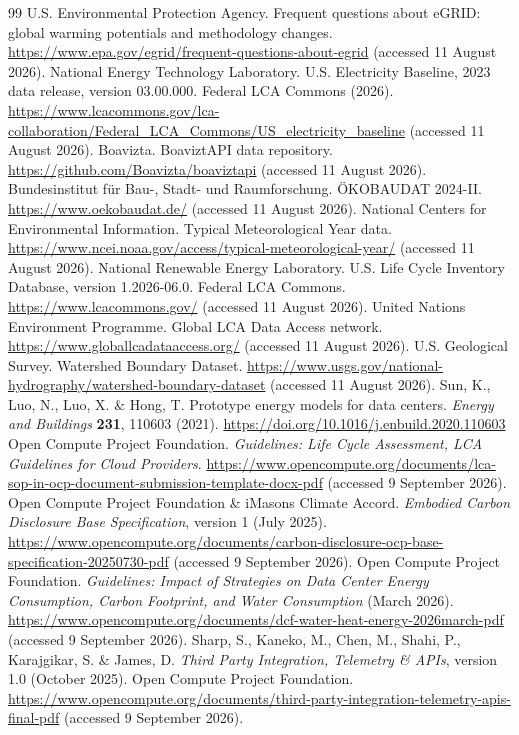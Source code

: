 \documentclass[review,12pt]{elsarticle}
\begin{document}
\begin{thebibliography}{99}
 U.S. Environmental Protection Agency. Frequent questions about eGRID: global warming potentials and methodology changes. \url{https://www.epa.gov/egrid/frequent-questions-about-egrid} (accessed 11 August 2026).
 National Energy Technology Laboratory. U.S. Electricity Baseline, 2023 data release, version 03.00.000. Federal LCA Commons (2026). \url{https://www.lcacommons.gov/lca-collaboration/Federal_LCA_Commons/US_electricity_baseline} (accessed 11 August 2026).
 Boavizta. BoaviztAPI data repository. \url{https://github.com/Boavizta/boaviztapi} (accessed 11 August 2026).
 Bundesinstitut für Bau-, Stadt- und Raumforschung. ÖKOBAUDAT 2024-II. \url{https://www.oekobaudat.de/} (accessed 11 August 2026).
 National Centers for Environmental Information. Typical Meteorological Year data. \url{https://www.ncei.noaa.gov/access/typical-meteorological-year/} (accessed 11 August 2026).
 National Renewable Energy Laboratory. U.S. Life Cycle Inventory Database, version 1.2026-06.0. Federal LCA Commons. \url{https://www.lcacommons.gov/} (accessed 11 August 2026).
 United Nations Environment Programme. Global LCA Data Access network. \url{https://www.globallcadataaccess.org/} (accessed 11 August 2026).
 U.S. Geological Survey. Watershed Boundary Dataset. \url{https://www.usgs.gov/national-hydrography/watershed-boundary-dataset} (accessed 11 August 2026).
 Sun, K., Luo, N., Luo, X. \& Hong, T. Prototype energy models for data centers. \textit{Energy and Buildings} \textbf{231}, 110603 (2021). \url{https://doi.org/10.1016/j.enbuild.2020.110603}
 Open Compute Project Foundation. \textit{Guidelines: Life Cycle Assessment, LCA Guidelines for Cloud Providers}. \url{https://www.opencompute.org/documents/lca-sop-in-ocp-document-submission-template-docx-pdf} (accessed 9 September 2026).
 Open Compute Project Foundation \& iMasons Climate Accord. \textit{Embodied Carbon Disclosure Base Specification}, version 1 (July 2025). \url{https://www.opencompute.org/documents/carbon-disclosure-ocp-base-specification-20250730-pdf} (accessed 9 September 2026).
 Open Compute Project Foundation. \textit{Guidelines: Impact of Strategies on Data Center Energy Consumption, Carbon Footprint, and Water Consumption} (March 2026). \url{https://www.opencompute.org/documents/dcf-water-heat-energy-2026march-pdf} (accessed 9 September 2026).
 Sharp, S., Kaneko, M., Chen, M., Shahi, P., Karajgikar, S. \& James, D. \textit{Third Party Integration, Telemetry \& APIs}, version 1.0 (October 2025). Open Compute Project Foundation. \url{https://www.opencompute.org/documents/third-party-integration-telemetry-apis-final-pdf} (accessed 9 September 2026).

\end{thebibliography}
\end{document}
